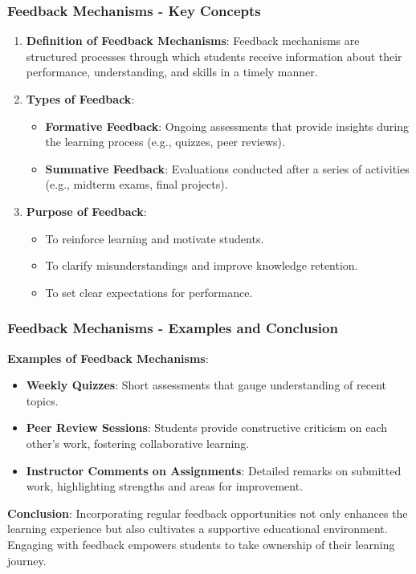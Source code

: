 \documentclass[aspectratio=169]{beamer}
\begin{document}
\begin{frame}[fragile]
    \frametitle{Feedback Mechanisms - Key Concepts}
    \begin{enumerate}
        \item \textbf{Definition of Feedback Mechanisms}:
        Feedback mechanisms are structured processes through which students receive information about their performance, understanding, and skills in a timely manner.
        
        \item \textbf{Types of Feedback}:
        \begin{itemize}
            \item \textbf{Formative Feedback}: Ongoing assessments that provide insights during the learning process (e.g., quizzes, peer reviews).
            \item \textbf{Summative Feedback}: Evaluations conducted after a series of activities (e.g., midterm exams, final projects).
        \end{itemize}
        
        \item \textbf{Purpose of Feedback}:
        \begin{itemize}
            \item To reinforce learning and motivate students.
            \item To clarify misunderstandings and improve knowledge retention.
            \item To set clear expectations for performance.
        \end{itemize}
    \end{enumerate}  
\end{frame}

\begin{frame}[fragile]
    \frametitle{Feedback Mechanisms - Examples and Conclusion}
    
    \textbf{Examples of Feedback Mechanisms}:
    \begin{itemize}
        \item \textbf{Weekly Quizzes}: Short assessments that gauge understanding of recent topics.
        \item \textbf{Peer Review Sessions}: Students provide constructive criticism on each other's work, fostering collaborative learning.
        \item \textbf{Instructor Comments on Assignments}: Detailed remarks on submitted work, highlighting strengths and areas for improvement.
    \end{itemize}

    \textbf{Conclusion}:
    Incorporating regular feedback opportunities not only enhances the learning experience but also cultivates a supportive educational environment. Engaging with feedback empowers students to take ownership of their learning journey.
\end{frame}
\end{document}
